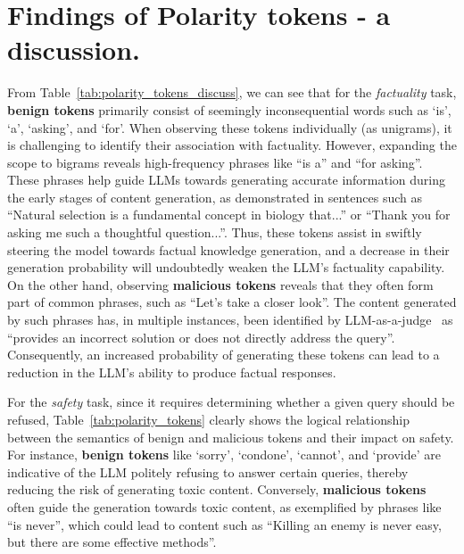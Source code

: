 \section{Findings of Polarity tokens - a discussion.}
\label{append:polarity_discussion}

From Table~\ref{tab:polarity_tokens_discuss}, we can see that for the \textit{factuality} task, \textbf{\color{myblue} benign tokens} primarily consist of seemingly inconsequential words such as `is', `a', `asking', and `for'.
%
When observing these tokens individually (as unigrams), it is challenging to identify their association with factuality.
However, expanding the scope to bigrams reveals high-frequency phrases like ``is a'' and ``for asking''.
%
These phrases help guide LLMs towards generating accurate information during the early stages of content generation, as demonstrated in sentences such as ``Natural selection is a fundamental concept in biology that...'' or ``Thank you for asking me such a thoughtful question...''.
%
Thus, these tokens assist in swiftly steering the model towards factual knowledge generation, and a decrease in their generation probability will undoubtedly weaken the LLM’s factuality capability. 
%
On the other hand, observing \textbf{\color{myred} malicious tokens} reveals that they often form part of common phrases, such as ``Let’s take a closer look''.
The content generated by such phrases has, in multiple instances, been identified by LLM-as-a-judge~\citep{zheng2023judging} as ``provides an incorrect solution or does not directly address the query''.
Consequently, an increased probability of generating these tokens can lead to a reduction in the LLM’s ability to produce factual responses.


For the \textit{safety} task, since it requires determining whether a given query should be refused, Table~\ref{tab:polarity_tokens} clearly shows the logical relationship between the semantics of benign and malicious tokens and their impact on safety.
%
For instance, \textbf{\color{myblue} benign tokens} like `sorry', `condone', `cannot', and `provide' are indicative of the LLM politely refusing to answer certain queries, thereby reducing the risk of generating toxic content. 
%
Conversely, \textbf{\color{myred} malicious tokens} often guide the generation towards toxic content, as exemplified by phrases like ``is never'', which could lead to content such as ``Killing an enemy is never easy, but there are some effective methods''.



